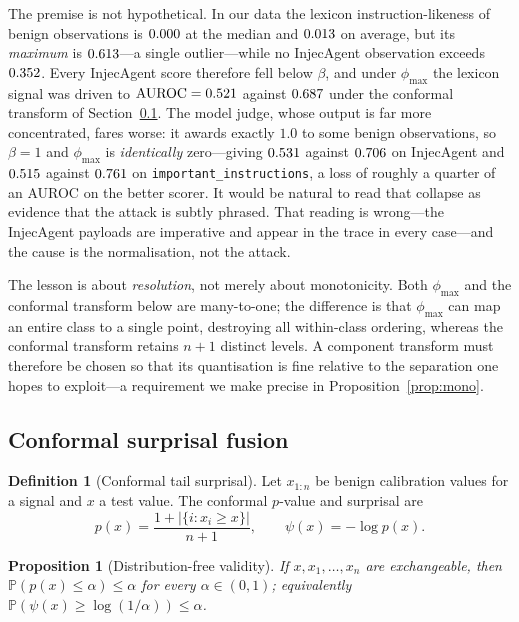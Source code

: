 \documentclass[preprint,12pt,number]{elsarticle}
\newtheorem{proposition}[theorem]{Proposition}
\theoremstyle{definition}
\newtheorem{definition}{Definition}
\newcommand{\Prob}{\mathbb{P}}
\begin{document}
The premise is not hypothetical. In our data the lexicon instruction-likeness of
benign observations is $0.000$ at the median and $0.013$ on average,
but its \emph{maximum} is $0.613$---a single outlier---while no InjecAgent
observation exceeds $0.352$. Every InjecAgent score therefore fell below
$\beta$, and under $\phi_{\max}$ the lexicon signal was driven to
$\mathrm{AUROC} = 0.521$ against $0.687$ under the conformal
transform of Section~\ref{sec:fusion}. The model judge, whose output is far more
concentrated, fares worse: it awards exactly $1.0$ to some benign observations, so
$\beta = 1$ and $\phi_{\max}$ is \emph{identically} zero---giving
$0.531$ against $0.706$ on InjecAgent and
$0.515$ against $0.761$ on
\texttt{important\_instructions}, a loss of roughly a quarter of an AUROC on the
better scorer. It would be natural to read that collapse as evidence that the
attack is subtly phrased. That reading is wrong---the InjecAgent payloads are
imperative and appear in the trace in every case---and the cause is the
normalisation, not the attack.

The lesson is about \emph{resolution}, not merely about monotonicity. Both
$\phi_{\max}$ and the conformal transform below are many-to-one; the difference is
that $\phi_{\max}$ can map an entire class to a single point, destroying all
within-class ordering, whereas the conformal transform retains $n+1$ distinct
levels. A component transform must therefore be chosen so that its quantisation
is fine relative to the separation one hopes to exploit---a requirement we make
precise in Proposition~\ref{prop:mono}.

\subsection{Conformal surprisal fusion}\label{sec:fusion}

\begin{definition}[Conformal tail surprisal]
Let $x_{1:n}$ be benign calibration values for a signal and $x$ a test value. The
conformal $p$-value and surprisal are
\begin{equation}\label{eq:conformal}
p(x) = \frac{1 + |\{i : x_i \ge x\}|}{n+1},
\qquad
\psi(x) = -\log p(x).
\end{equation}
\end{definition}

\begin{proposition}[Distribution-free validity]\label{prop:valid}
If $x, x_1, \dots, x_n$ are exchangeable, then $\Prob(p(x) \le \alpha) \le \alpha$
for every $\alpha \in (0,1)$; equivalently
$\Prob(\psi(x) \ge \log(1/\alpha)) \le \alpha$.
\end{proposition}
\end{document}
